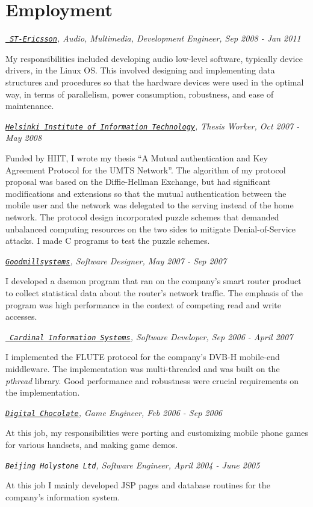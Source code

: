 \documentclass[10pt,letterpaper]{article}
\newenvironment{aperiod}{
  \begin{list}{}{
    \setlength{\leftmargin}{1.5em}
    \setlength{\itemsep}{1em}
    \setlength{\parskip}{0pt}
    \setlength{\parsep}{0.25em}
  }
}{
  \end{list}
}
\begin{document}
\section*{Employment}
\begin{aperiod}
\item {\it \href{http://www.stericsson.com}{\tt
      ST-Ericsson}, Audio, Multimedia, Development Engineer, Sep 2008
    - Jan 2011}

  My responsibilities included developing audio low-level software,
  typically device drivers, in the Linux OS. This involved designing and
  implementing data structures and procedures so that the hardware
  devices were used in the optimal way, in terms of parallelism,
  power consumption, robustness, and ease of maintenance.

\item {\it \href{http://www.hiit.fi}{\tt Helsinki
      Institute of Information Technology}, Thesis Worker, Oct 2007 -
    May 2008}

  Funded by HIIT, I wrote my thesis ``A Mutual authentication and Key
  Agreement Protocol for the UMTS Network''. The algorithm of my
  protocol proposal was based on the Diffie-Hellman Exchange, but had
  significant modifications and extensions so that the mutual
  authentication between the mobile user and the network was delegated
  to the serving instead of the home network. The protocol design
  incorporated puzzle schemes that demanded unbalanced computing
  resources on the two sides to mitigate Denial-of-Service attacks. I
  made C programs to test the puzzle schemes.

\item {\it
    \href{http://www.goodmillsystems.com}{\tt Goodmillsystems},
    Software Designer, May 2007 - Sep 2007}

  I developed a daemon program that ran on the company's smart router
  product to collect statistical data about the router's network
  traffic. The emphasis of the program was high performance in the
  context of competing read and write accesses.

\item {\it \href{http://www.cardinal.fi/}{\tt
      Cardinal Information Systems}, Software Developer, Sep 2006 -
    April 2007}

  I implemented the FLUTE protocol for the company's DVB-H
  mobile-end middleware. The implementation was multi-threaded and was
  built on the {\it pthread} library. Good performance and robustness
  were crucial requirements on the implementation.

\item {\it
    \href{http://www.digitalchocolate.com/}{\tt Digital Chocolate},
    Game Engineer, Feb 2006 - Sep 2006}

  At this job, my responsibilities were porting and customizing mobile
  phone games for various handsets, and making game demos.

\item {\it {\tt Beijing Holystone Ltd}, Software
    Engineer, April 2004 - June 2005}

  At this job I mainly developed JSP pages and database routines for
  the company's information system.
\end{aperiod}
\end{document}
